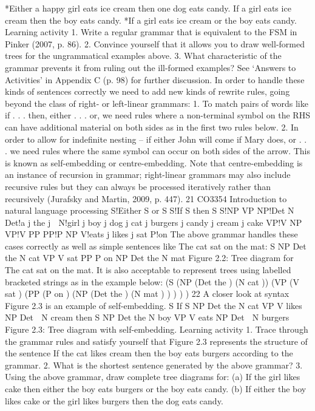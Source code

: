 *Either a happy girl eats ice cream then one dog eats candy.
If a girl eats ice cream then the boy eats candy.
*If a girl eats ice cream or the boy eats candy.
Learning activity
1. Write a regular grammar that is equivalent to the FSM in Pinker (2007, p. 86).
2. Convince yourself that it allows you to draw well-formed trees for the ungrammatical examples above.
3. What characteristic of the grammar prevents it from ruling out the ill-formed examples?
See ‘Answers to Activities’ in Appendix C (p. 98) for further discussion.
In order to handle these kinds of sentences correctly we need to add new kinds of
rewrite rules, going beyond the class of right- or left-linear grammars:
1. To match pairs of words like if . . . then, either . . . or, we need rules where a
non-terminal symbol on the RHS can have additional material on both sides as
in the first two rules below.
2. In order to allow for indefinite nesting – if either John will come if Mary does, or
. . . we need rules where the same symbol can occur on both sides of the arrow.
This is known as self-embedding or centre-embedding.
Note that centre-embedding is an instance of recursion in grammar; right-linear
grammars may also include recursive rules but they can always be processed
iteratively rather than recursively (Jurafsky and Martin, 2009, p. 447).
21
CO3354 Introduction to natural language processing
S!Either S or S
S!If S then S
S!NP VP
NP!Det N
Det!a j the j 
N!girl j boy j dog j cat j burgers j candy j cream j cake
VP!V NP
VP!V PP
PP!P NP
V!eats j likes j sat
P!on
The above grammar handles these cases correctly as well as simple sentences like
The cat sat on the mat:
S
NP
Det
the
N
cat
VP
V
sat
PP
P
on
NP
Det
the
N
mat
Figure 2.2: Tree diagram for The cat sat on the mat.
It is also acceptable to represent trees using labelled bracketed strings as in the
example below:
(S
(NP (Det the ) (N cat ))
(VP (V sat )
(PP
(P on )
(NP
(Det the ) (N mat ) )
)
)
)
22
A closer look at syntax
Figure 2.3 is an example of self-embedding.
S
If S
NP
Det
the
N
cat
VP
V
likes
NP
Det

N
cream
then S
NP
Det
the
N
boy
VP
V
eats
NP
Det

N
burgers
Figure 2.3: Tree diagram with self-embedding.
Learning activity
1. Trace through the grammar rules and satisfy yourself that Figure 2.3 represents the structure of the
sentence If the cat likes cream then the boy eats burgers according to the grammar.
2. What is the shortest sentence generated by the above grammar?
3. Using the above grammar, draw complete tree diagrams for:
(a) If the girl likes cake then either the boy eats burgers or the boy eats candy.
(b) If either the boy likes cake or the girl likes burgers then the dog eats candy.

